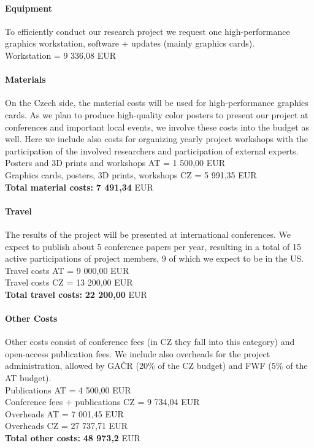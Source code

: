 \documentclass[11pt,a4paper,titlepage,oneside,onecolumn]{article}
\begin{document}
\paragraph{Equipment}
To efficiently conduct our research project we request one high-performance graphics workstation, software + updates (mainly graphics cards).\\
Workstation = 9 336,08 EUR 
 
\paragraph{Materials}
On the Czech side, the material costs will be used for high-performance graphics cards. As we plan to produce high-quality color posters to present our project at conferences and important local events, we involve these costs into the budget as well. Here we include also costs for organizing yearly project workshops with the participation of the involved researchers and participation of external experts.\\
Posters and 3D prints and workshops AT = 1 500,00 EUR\\
Graphics cards, posters, 3D prints, workshops CZ = 5 991,35 EUR\\
\textbf{Total material costs:}   \textbf{7 491,34} EUR

\paragraph{Travel}
The results of the project will be presented at international conferences. We expect to publish about 5 conference papers per year, resulting in a total of 15 active participations of project members, 9 of which we expect to be in the US.\\
Travel costs AT = 9 000,00 EUR\\
Travel costs CZ = 13 200,00 EUR\\
\textbf{Total travel costs:}   \textbf{22 200,00} EUR

\paragraph{Other Costs}
Other costs consist of conference fees (in CZ they fall into this category) and open-access publication fees. We include also overheads for the project administration, allowed by GA\v{C}R (20\% of the CZ budget) and FWF (5\% of the AT budget).\\
Publications AT = 4 500,00 EUR\\
Conference fees + publications CZ = 9 734,04 EUR\\
Overheads AT = 7 001,45 EUR\\
Overheads CZ = 27 737,71 EUR\\
\textbf{Total other costs:}   \textbf{48 973,2} EUR
\end{document}
